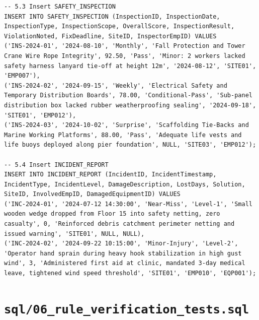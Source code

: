 \documentclass[a4paper,12pt]{report}
\begin{document}
\begin{lstlisting}
-- 5.3 Insert SAFETY_INSPECTION
INSERT INTO SAFETY_INSPECTION (InspectionID, InspectionDate, InspectionType, InspectionScope, OverallScore, InspectionResult, ViolationNoted, FixDeadline, SiteID, InspectorEmpID) VALUES
('INS-2024-01', '2024-08-10', 'Monthly', 'Fall Protection and Tower Crane Wire Rope Integrity', 92.50, 'Pass', 'Minor: 2 workers lacked safety harness lanyard tie-off at height 12m', '2024-08-12', 'SITE01', 'EMP007'),
('INS-2024-02', '2024-09-15', 'Weekly', 'Electrical Safety and Temporary Distribution Boards', 78.00, 'Conditional-Pass', 'Sub-panel distribution box lacked rubber weatherproofing sealing', '2024-09-18', 'SITE01', 'EMP012'),
('INS-2024-03', '2024-10-02', 'Surprise', 'Scaffolding Tie-Backs and Marine Working Platforms', 88.00, 'Pass', 'Adequate life vests and life buoys deployed along pier foundation', NULL, 'SITE03', 'EMP012');

-- 5.4 Insert INCIDENT_REPORT
INSERT INTO INCIDENT_REPORT (IncidentID, IncidentTimestamp, IncidentType, IncidentLevel, DamageDescription, LostDays, Solution, SiteID, InvolvedEmpID, DamagedEquipmentID) VALUES
('INC-2024-01', '2024-07-12 14:30:00', 'Near-Miss', 'Level-1', 'Small wooden wedge dropped from Floor 15 into safety netting, zero casualty', 0, 'Reinforced debris catchment perimeter netting and issued warning', 'SITE01', NULL, NULL),
('INC-2024-02', '2024-09-22 10:15:00', 'Minor-Injury', 'Level-2', 'Operator hand sprain during heavy hook stabilization in high gust wind', 3, 'Administered first aid at clinic, mandated 3-day medical leave, tightened wind speed threshold', 'SITE01', 'EMP010', 'EQP001');
\end{lstlisting}

\section{\texorpdfstring{\texttt{sql/06\_\allowbreak{}rule\_\allowbreak{}verification\_\allowbreak{}tests.\allowbreak{}sql}}{sql/06ruleverificationtests.sql}}\label{a.4-sql06_rule_verification_tests.sql}
\end{document}
